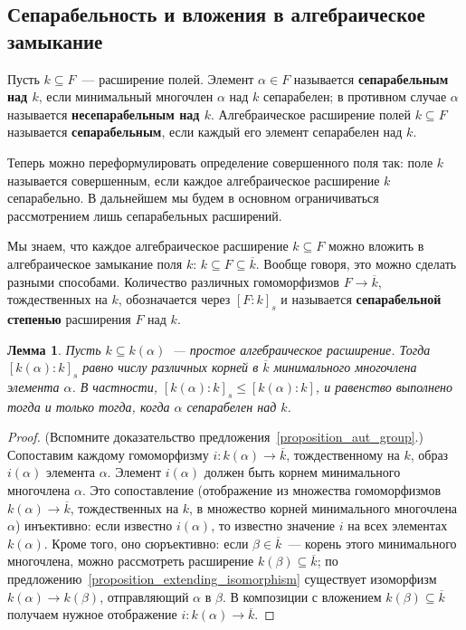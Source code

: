 \documentclass[a4paper,11pt]{scrartcl}
\theoremstyle{plain}
\newtheorem{lemma}[theorem]{Лемма}
\theoremstyle{definition}
\newcommand\dfn[1]{\textbf{#1}}
\newcommand\sseq{\subseteq}
\begin{document}
\subsection{Сепарабельность и вложения в алгебраическое замыкание}

Пусть $k\sseq F$~--- расширение полей. Элемент $\alpha\in F$
называется
\dfn{сепарабельным над $k$}, если минимальный многочлен $\alpha$ над
$k$
сепарабелен; в противном случае $\alpha$ называется
\dfn{несепарабельным над $k$}.
Алгебраическое расширение полей $k\sseq F$ называется
\dfn{сепарабельным}, если каждый его элемент сепарабелен над $k$.

Теперь можно переформулировать определение совершенного поля так: поле
$k$ называется совершенным, если каждое алгебраическое расширение $k$
сепарабельно. В дальнейшем мы будем в основном ограничиваться
рассмотрением лишь сепарабельных расширений.

Мы знаем, что каждое алгебраическое расширение $k\sseq F$ можно
вложить в алгебраическое замыкание поля $k$: $k\sseq
F\sseq\overline{k}$. Вообще говоря, это можно сделать разными
способами. Количество различных гомоморфизмов $F\to\overline{k}$,
тождественных на $k$, обозначается через $[F:k]_s$ и называется
\dfn{сепарабельной степенью} расширения $F$ над $k$.

\begin{lemma}\label{lemma_separable_different_roots}
Пусть $k\sseq k(\alpha)$~--- простое алгебраическое расширение. Тогда
$[k(\alpha):k]_s$ равно числу различных корней в $\overline{k}$
минимального многочлена элемента $\alpha$. В частности,
$[k(\alpha):k]_s\leq [k(\alpha):k]$, и равенство выполнено тогда и
только тогда, когда $\alpha$ сепарабелен над $k$.
\end{lemma}
\begin{proof}
(Вспомните доказательство
предложения~\ref{proposition_aut_group}.) Сопоставим каждому
гомоморфизму $i\colon k(\alpha)\to\overline{k}$, тождественному на
$k$, образ $i(\alpha)$ элемента $\alpha$. Элемент $i(\alpha)$ должен
быть корнем минимального многочлена $\alpha$. Это сопоставление 
(отображение из
множества гомоморфизмов $k(\alpha)\to\overline{k}$, тождественных на
$k$,
в множество корней минимального многочлена $\alpha$) инъективно: если
известно $i(\alpha)$, то известно значение $i$ на всех элементах
$k(\alpha)$. Кроме того, оно сюръективно: если $\beta\in\overline
{k}$~---
корень этого минимального многочлена, можно рассмотреть расширение
$k(\beta)\sseq\overline{k}$; по
предложению~\ref{proposition_extending_isomorphism} существует
изоморфизм $k(\alpha)\to k(\beta)$, отправляющий $\alpha$ в $\beta$.
В композиции с
вложением $k(\beta)\sseq\overline{k}$ получаем нужное отображение
$i\colon k(\alpha)\to\overline{k}$.
\end{proof}
\end{document}
